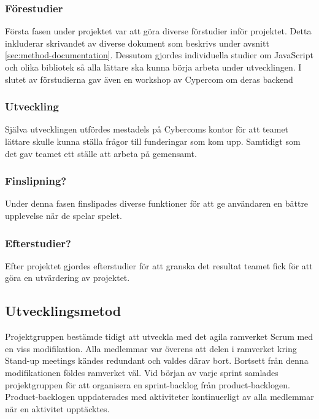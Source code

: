 \subsubsection*{Förestudier}
Första fasen under projektet var att göra diverse förstudier inför projektet. Detta inkluderar skrivandet av diverse dokument som beskrivs under avsnitt \ref{sec:method-documentation}. Dessutom gjordes individuella studier om JavaScript och olika bibliotek så alla lättare ska kunna börja arbeta under utvecklingen. I slutet av förstudierna gav även en workshop av Cypercom om deras backend 

\subsubsection*{Utveckling}
Själva utvecklingen utfördes mestadels på Cybercoms kontor för att teamet lättare skulle kunna ställa frågor till funderingar som kom upp. Samtidigt som det gav teamet ett ställe att arbeta på gemensamt.

{
  \color{red}

\subsubsection*{Finslipning?}
Under denna fasen finslipades diverse funktioner för att ge användaren en bättre upplevelse när de spelar spelet.

\subsubsection*{Efterstudier?}
Efter projektet gjordes efterstudier för att granska det resultat teamet fick för att göra en utvärdering av projektet.
}
\subsection{Utvecklingsmetod}
Projektgruppen bestämde tidigt att utveckla med det agila ramverket Scrum med en viss modifikation. Alla medlemmar var överens att delen i ramverket kring Stand-up meetings kändes redundant och valdes därav bort. Bortsett från denna modifikationen földes ramverket väl. Vid början av varje sprint samlades projektgruppen för att organisera en sprint-backlog från product-backlogen. Product-backlogen uppdaterades med aktiviteter kontinuerligt av alla medlemmar när en aktivitet upptäcktes.  

